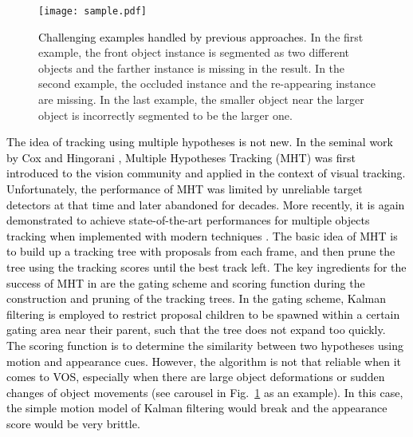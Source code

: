 \documentclass[10pt,twocolumn,letterpaper]{article}
\newcommand{\bao}[1]{\textcolor{black}{#1}}
\begin{document}
\begin{figure}[t]
\vspace{-10pt}
\centering
\texttt{[image: sample.pdf]}
\caption{\bao{Challenging examples handled by previous approaches}. In the first example, the front object instance is segmented as two different objects and the farther instance is missing in the result. In the second example, the occluded instance and the re-appearing instance are missing. In the last example, the smaller object near the larger object is incorrectly segmented to be the larger one.}
\label{fig:sample}
\vspace{-10pt}
\end{figure}


\bao{The idea of tracking using multiple hypotheses is not new. 
In the seminal work by Cox and Hingorani \cite{Cox1996An},  Multiple Hypotheses Tracking (MHT) was first introduced to the vision community and applied in the context of visual tracking.
Unfortunately, the performance of MHT was limited by unreliable target detectors at that time and later abandoned for decades. 
More recently, it is again demonstrated to achieve state-of-the-art performances for multiple objects tracking when implemented with modern techniques \cite{kim2015multiple}. 
The basic idea of MHT is to build up a tracking tree with proposals from each frame, and then prune the tree using the tracking scores until the best track left. 
The key ingredients for the success of MHT in \cite{kim2015multiple} are the gating scheme and scoring function during the construction and pruning of the tracking trees. 
In the gating scheme, Kalman filtering is employed to restrict proposal children to be spawned within a certain gating area near their parent, such that the tree does not expand too quickly.
The scoring function is to determine the similarity between two hypotheses using motion and appearance cues. 
However, the algorithm is not that reliable when it comes to VOS, especially when there are large object deformations or sudden changes of object movements (see carousel in Fig.~\ref{fig:sample} as an example). 
In this case, the simple motion model of Kalman filtering would break and the appearance score would be very brittle. 
}
\end{document}
